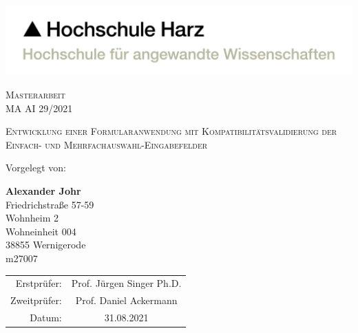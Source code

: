 \begin{titlepage}

    \includegraphics[width=0.5\paperwidth]{Sonstiges/Deckblatt/HSH-Logo-RGB-dt.pdf}

    \begin{center}

        \vfill

        \Huge{\textsc{Masterarbeit}}\\
        \vspace{1mm}
        \large{\textsc{MA AI 29/2021}}

        \vfill
        \LARGE{\textsc{Entwicklung einer Formularanwendung mit Kompatibilitätsvalidierung der Einfach- und Mehrfachauswahl-Eingabefelder}}

        \vfill
        \vfill
        \vfill



        \normalsize
        Vorgelegt von:\\
        \vspace{3mm}

        \textbf{Alexander Johr}\\
        Friedrichstraße 57-59\\
        Wohnheim 2\\
        Wohneinheit 004\\
        38855 Wernigerode\\
        m27007

        \vspace{21mm}

        \begin{tabular}{r c}
            Erstprüfer:  & Prof. Jürgen Singer Ph.D. \\
            Zweitprüfer: & Prof. Daniel Ackermann    \\
            Datum:       & 31.08.2021                \\
        \end{tabular}

        \vspace{5mm}

    \end{center}

\end{titlepage}
